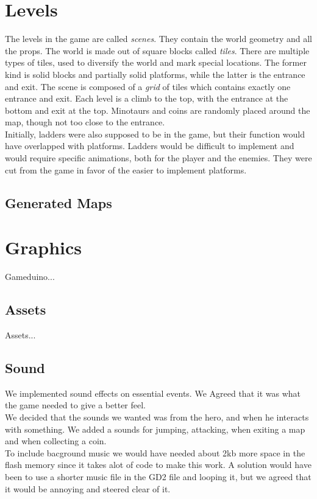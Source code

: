 \section{Levels} %
The levels in the game are called \emph{scenes}. They contain the world geometry and all the props. The world is made out of square blocks called \emph{tiles}. There are multiple types of tiles, used to diversify the world and mark special locations. The former kind is solid blocks and partially solid platforms, while the latter is the entrance and exit. The scene is composed of a \emph{grid} of tiles which contains exactly one entrance and exit. Each level is a climb to the top, with the entrance at the bottom and exit at the top. Minotaurs and coins are randomly placed around the map, though not too close to the entrance.\\
Initially, ladders were also supposed to be in the game, but their function would have overlapped with platforms. Ladders would be difficult to implement and would require specific animations, both for the player and the enemies. They were cut from the game in favor of the easier to implement platforms.

\subsection{Generated Maps}

\section{Graphics}
Gameduino...

\subsection{Assets}
Assets...

\subsection{Sound} %

We implemented sound effects on essential events. We Agreed that it was what the game needed to give a better feel.\\
We decided that the sounds we wanted was from the hero, and when he interacts with something. We added a sounds for jumping, attacking, when exiting a map and when collecting a coin.\\
To include bacground music we would have needed about 2kb more space in the flash memory since it takes alot of code to make this work. A solution would have been to use a shorter music file in the GD2 file and looping it, but we agreed that it would be annoying and steered clear of it.


